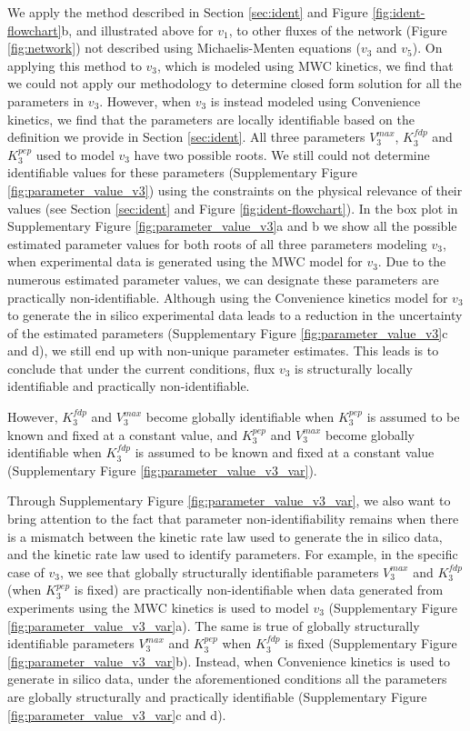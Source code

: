 \documentclass[10pt]{article}
\begin{document}
	We apply the method described in Section \ref{sec:ident} and Figure \ref{fig:ident-flowchart}b, and illustrated above for $v_1$, to other fluxes of the network (Figure \ref{fig:network}) not described using Michaelis-Menten equations ($v_3$ and $v_5$). On applying this method to $v_3$, which is modeled using MWC kinetics, we find that we could not apply our methodology to determine closed form solution for all the parameters in $v_3$. However, when $v_3$ is instead modeled using Convenience kinetics, we find that the parameters are locally identifiable based on the definition we provide in Section \ref{sec:ident}. All three parameters $V_3^{max}$, $K_3^{fdp}$ and $K_3^{pep}$ used to model $v_3$ have two possible roots. We still could not determine identifiable values for these parameters (Supplementary Figure \ref{fig:parameter_value_v3}) using the constraints on the physical relevance of their values (see Section \ref{sec:ident} and Figure \ref{fig:ident-flowchart}). In the box plot in Supplementary Figure \ref{fig:parameter_value_v3}a and b we show all the possible estimated parameter values for both roots of all three parameters modeling $v_3$, when experimental data is generated using the MWC model for $v_3$. Due to the numerous estimated parameter values, we can designate these parameters are practically non-identifiable. Although using the Convenience kinetics model for $v_3$ to generate the in silico experimental data leads to a reduction in the uncertainty of the estimated parameters (Supplementary Figure \ref{fig:parameter_value_v3}c and d), we still end up with non-unique parameter estimates. This leads is to conclude that under the current conditions, flux $v_3$ is structurally locally identifiable and practically non-identifiable. 
	
	However, $K_3^{fdp}$ and $V_3^{max}$ become globally identifiable when $K_3^{pep}$ is assumed to be known and fixed at a constant value, and $K_3^{pep}$ and $V_3^{max}$ become globally identifiable when $K_3^{fdp}$ is assumed to be known and fixed at a constant value (Supplementary Figure \ref{fig:parameter_value_v3_var}). 
	
	Through Supplementary Figure \ref{fig:parameter_value_v3_var}, we also want to bring attention to the fact that parameter non-identifiability remains when there is a mismatch between the kinetic rate law used to generate the in silico data, and the kinetic rate law used to identify parameters. For example, in the specific case of $v_3$, we see that globally structurally identifiable parameters $V_3^{max}$ and $K_3^{fdp}$ (when $K_3^{pep}$ is fixed) are practically non-identifiable when data generated from experiments using the MWC kinetics is used to model $v_3$ (Supplementary Figure \ref{fig:parameter_value_v3_var}a). The same is true of globally structurally identifiable parameters $V_3^{max}$ and $K_3^{pep}$ when $K_3^{fdp}$ is fixed (Supplementary Figure \ref{fig:parameter_value_v3_var}b). Instead, when Convenience kinetics is used to generate in silico data, under the aforementioned conditions all the parameters are globally structurally and practically identifiable (Supplementary Figure \ref{fig:parameter_value_v3_var}c and d).
	
\end{document}
